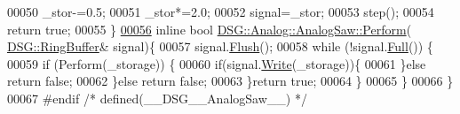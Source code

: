 \begin{DoxyCode}
00050             \_stor-=0.5;
00051             \_stor*=2.0;
00052             signal=\_stor;
00053             step();
00054             \textcolor{keywordflow}{return} \textcolor{keyword}{true};
00055         \}
\hypertarget{_analog_saw_8h_source_l00056}{}\hyperlink{class_d_s_g_1_1_analog_1_1_analog_saw_a38f091059d924c9141fee3e27522e7e1}{00056}         \textcolor{keyword}{inline} \textcolor{keywordtype}{bool} \hyperlink{class_d_s_g_1_1_analog_1_1_analog_saw_a8d36e77c09ba84128e786c7bb14cddda}{DSG::Analog::AnalogSaw::Perform}(
      \hyperlink{class_d_s_g_1_1_ring_buffer}{DSG::RingBuffer}& signal)\{
00057             signal.\hyperlink{class_d_s_g_1_1_ring_buffer_ab23c8003d2857809a816068eeb209d60}{Flush}();
00058             \textcolor{keywordflow}{while} (!signal.\hyperlink{class_d_s_g_1_1_ring_buffer_a53ddb04ffcbb5470a8d2b0a3c65b70cb}{Full}()) \{
00059                 \textcolor{keywordflow}{if} (Perform(\_storage)) \{
00060                     \textcolor{keywordflow}{if}(signal.\hyperlink{class_d_s_g_1_1_ring_buffer_aa5dd2caa0a270173251faee40a43d692}{Write}(\_storage))\{
00061                     \}\textcolor{keywordflow}{else} \textcolor{keywordflow}{return} \textcolor{keyword}{false};
00062                 \}\textcolor{keywordflow}{else} \textcolor{keywordflow}{return} \textcolor{keyword}{false};
00063             \}\textcolor{keywordflow}{return} \textcolor{keyword}{true};
00064         \}
00065     \}
00066 \}
00067 \textcolor{preprocessor}{#endif }\textcolor{comment}{/* defined(\_\_DSG\_\_AnalogSaw\_\_) */}\textcolor{preprocessor}{}
\end{DoxyCode}
